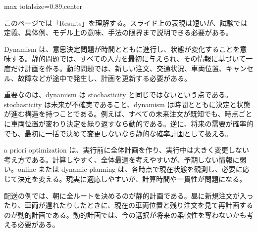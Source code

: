 \begin{minipage}[t]{0.58\textwidth}
\begin{adjustbox}{max totalsize={\textwidth}{0.89\textheight},center}
\begin{minipage}{\textwidth}\scriptsize
{}このページでは「Results」を理解する。スライド上の表現は短いが、試験では定義、具体例、モデル上の意味、手法の限界まで説明できる必要がある。\par
Dynamism は、意思決定問題が時間とともに進行し、状態が変化することを意味する。静的問題では、すべての入力を最初に与えられ、その情報に基づいて一度だけ計画を作る。動的問題では、新しい注文、交通状況、車両位置、キャンセル、故障などが途中で発生し、計画を更新する必要がある。\par
重要なのは、dynamism は stochasticity と同じではないという点である。stochasticity は未来が不確実であること、dynamism は時間とともに決定と状態が進む構造を持つことである。例えば、すべての未来注文が既知でも、時点ごとに車両位置が変わり決定を繰り返すなら動的である。逆に、将来の需要が確率的でも、最初に一括で決めて変更しないなら静的な確率計画として扱える。\par
a priori optimization は、実行前に全体計画を作り、実行中は大きく変更しない考え方である。計算しやすく、全体最適を考えやすいが、予期しない情報に弱い。online または dynamic planning は、各時点で現在状態を観測し、必要に応じて決定を変える。現実に適応しやすいが、計算時間や一貫性が問題になる。\par
配送の例では、朝に全ルートを決めるのが静的計画である。昼に新規注文が入ったり、車両が遅れたりしたときに、現在の車両位置と残り注文を見て再計画するのが動的計画である。動的計画では、今の選択が将来の柔軟性を奪わないかも考える必要がある。\par

\end{minipage}
\end{adjustbox}
\end{minipage}
